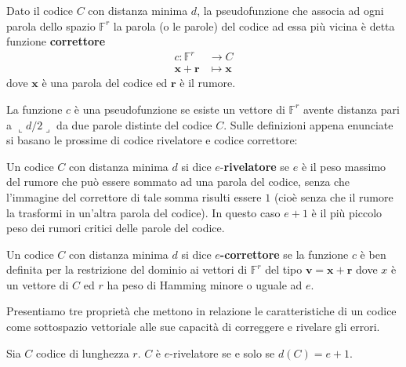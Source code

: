 \begin{definizione}
   Dato il codice $C$ con distanza minima $d$, la pseudofunzione che associa ad ogni parola dello spazio $\mathbb{F}^{r}$ la parola (o le parole) del codice ad essa più vicina è detta funzione {\bf correttore}
   \begin{align*}
       c: \mathbb{F}^{r}   &\longrightarrow  C \\
            \mathbf{x} + \mathbf{r} &\longmapsto  \mathbf{x}  
   \end{align*}
   dove $\mathbf{x}$ è una parola del codice ed $\mathbf{r}$ è il rumore.
\end{definizione}
\noindent
La funzione $c$ è una pseudofunzione se esiste un vettore di $\mathbb{F}^{r}$ avente distanza pari a $\llcorner d/2 \lrcorner$ da due parole distinte del codice $C$. Sulle definizioni appena enunciate si basano le prossime di codice rivelatore e codice correttore:
\begin{definizione}
   Un codice $C$ con distanza minima $d$ si dice $e$-{\bf rivelatore} se $e$ è il peso massimo del rumore che può essere sommato ad una parola del codice, senza che l'immagine del correttore di tale somma risulti essere $1$ (cioè senza che il rumore la trasformi in un'altra parola del codice). In questo caso $e+1$ è il più piccolo peso dei rumori critici delle parole del codice. 
\end{definizione}
\begin{definizione}
   Un codice $C$ con distanza minima $d$ si dice {\bf $e$-correttore} se la funzione $c$ è ben definita per la restrizione del dominio ai vettori di $\mathbb{F}^{r}$ del tipo $\mathbf{v} = \mathbf{x} + \mathbf{r}$ dove $x$ è un vettore di $C$ ed $r$ ha peso di Hamming minore o uguale ad $e$.
\end{definizione}
\noindent
Presentiamo tre proprietà che mettono in relazione le caratteristiche di un codice come sottospazio vettoriale alle sue capacità di correggere e rivelare gli errori.
\begin{prop} \label{cap2_1:propcodici1}
   Sia $C$ codice di lunghezza $r$. $C$ è $e$-rivelatore se e solo se $d(C)= e+1$.
\end{prop}
